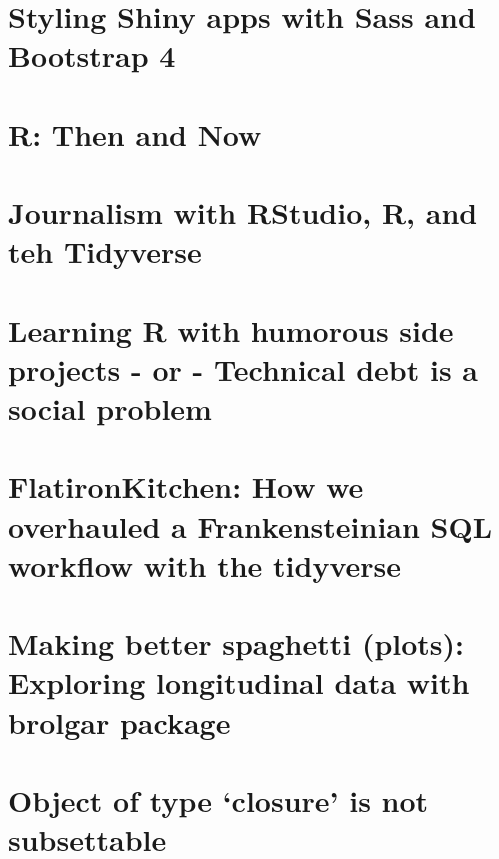 \documentclass[]{book}
\begin{document}
\hypertarget{styling-shiny-apps-with-sass-and-bootstrap-4}{%
\section{Styling Shiny apps with Sass and Bootstrap 4}\label{styling-shiny-apps-with-sass-and-bootstrap-4}}

\hypertarget{r-then-and-now}{%
\section{R: Then and Now}\label{r-then-and-now}}

\hypertarget{journalism-with-rstudio-r-and-teh-tidyverse}{%
\section{Journalism with RStudio, R, and teh Tidyverse}\label{journalism-with-rstudio-r-and-teh-tidyverse}}

\hypertarget{learning-r-with-humorous-side-projects---or---technical-debt-is-a-social-problem}{%
\section{Learning R with humorous side projects - or - Technical debt is a social problem}\label{learning-r-with-humorous-side-projects---or---technical-debt-is-a-social-problem}}

\hypertarget{flatironkitchen-how-we-overhauled-a-frankensteinian-sql-workflow-with-the-tidyverse}{%
\section{FlatironKitchen: How we overhauled a Frankensteinian SQL workflow with the tidyverse}\label{flatironkitchen-how-we-overhauled-a-frankensteinian-sql-workflow-with-the-tidyverse}}

\hypertarget{making-better-spaghetti-plots-exploring-longitudinal-data-with-brolgar-package}{%
\section{Making better spaghetti (plots): Exploring longitudinal data with brolgar package}\label{making-better-spaghetti-plots-exploring-longitudinal-data-with-brolgar-package}}

\hypertarget{object-of-type-closure-is-not-subsettable}{%
\section{Object of type `closure' is not subsettable}\label{object-of-type-closure-is-not-subsettable}}
\end{document}
